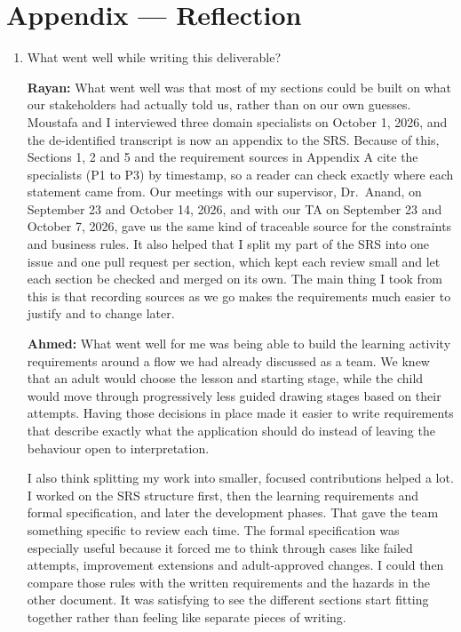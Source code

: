 \documentclass[12pt]{article}
\renewcommand{\_}{\textunderscore\allowbreak}%
\begin{document}
\newpage{}

\section{Appendix --- Reflection}
\label{app:reflection}



\begin{enumerate}

\item What went well while writing this deliverable?

\textbf{Rayan:} What went well was that most of my sections could be built on
what our stakeholders had actually told us, rather than on our own guesses.
Moustafa and I interviewed three domain specialists on October 1, 2026, and the
de-identified transcript is now an appendix to the SRS. Because of this,
Sections 1, 2 and 5 and the requirement sources in Appendix A cite the
specialists (P1 to P3) by timestamp, so a reader can check exactly where each
statement came from. Our meetings with our supervisor, Dr.~Anand, on September
23 and October 14, 2026, and with our TA on September 23 and October 7, 2026,
gave us the same kind of traceable source for the constraints and business
rules. It also helped that I split my part of the SRS into one issue and one
pull request per section, which kept each review small and let each section be
checked and merged on its own. The main thing I took from this is that recording
sources as we go makes the requirements much easier to justify and to change
later.

\textbf{Ahmed:} What went well for me was being able to build the learning
activity requirements around a flow we had already discussed as a team. We knew
that an adult would choose the lesson and starting stage, while the child would
move through progressively less guided drawing stages based on their attempts.
Having those decisions in place made it easier to write requirements that
describe exactly what the application should do instead of leaving the behaviour
open to interpretation.

I also think splitting my work into smaller, focused contributions helped a lot.
I worked on the SRS structure first, then the learning requirements and formal
specification, and later the development phases. That gave the team something
specific to review each time. The formal specification was especially useful
because it forced me to think through cases like failed attempts, improvement
extensions and adult-approved changes. I could then compare those rules with the
written requirements and the hazards in the other document. It was satisfying to
see the different sections start fitting together rather than feeling like
separate pieces of writing.


\end{enumerate}
\end{document}
